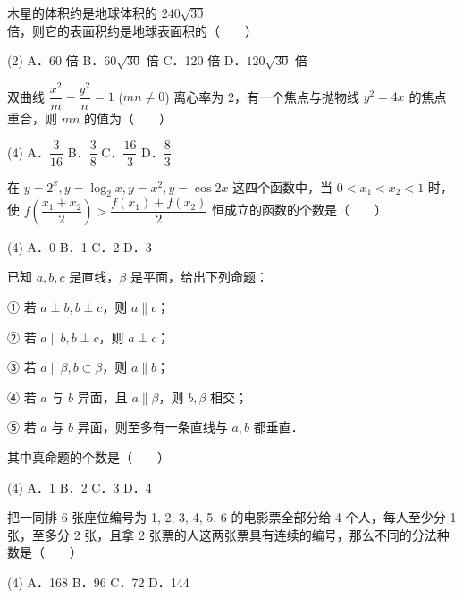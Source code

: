 \begin{question}
木星的体积约是地球体积的 $240\sqrt{30}$ 倍，则它的表面积约是地球表面积的\mbox{（　　）}

\begin{gkopts}(2)
\task A．60 倍
\task B．$60\sqrt{30}$ 倍
\task C．120 倍
\task D．$120\sqrt{30}$ 倍
\end{gkopts}

\end{question}
\begin{question}
双曲线 $\dfrac{x^2}{m} - \dfrac{y^2}{n} = 1$ ($mn \neq 0$) 离心率为 2，有一个焦点与抛物线 $y^2 = 4x$ 的焦点重合，则 $mn$ 的值为\mbox{（　　）}

\begin{gkopts}(4)
\task A．$\dfrac{3}{16}$
\task B．$\dfrac{3}{8}$
\task C．$\dfrac{16}{3}$
\task D．$\dfrac{8}{3}$
\end{gkopts}

\end{question}
\begin{question}
在 $y = 2^x, y = \log_2 x, y = x^2, y = \cos 2x$ 这四个函数中，当 $0 < x_1 < x_2 < 1$ 时，使 $f\left(\dfrac{x_1 + x_2}{2}\right) > \dfrac{f(x_1) + f(x_2)}{2}$ 恒成立的函数的个数是\mbox{（　　）}

\begin{gkopts}(4)
\task A．0
\task B．1
\task C．2
\task D．3
\end{gkopts}

\end{question}
\begin{question}
已知 $a, b, c$ 是直线，$\beta$ 是平面，给出下列命题：

① 若 $a \perp b, b \perp c$，则 $a \parallel c$；

② 若 $a \parallel b, b \perp c$，则 $a \perp c$；

③ 若 $a \parallel \beta, b \subset \beta$，则 $a \parallel b$；

④ 若 $a$ 与 $b$ 异面，且 $a \parallel \beta$，则 $b, \beta$ 相交；

⑤ 若 $a$ 与 $b$ 异面，则至多有一条直线与 $a, b$ 都垂直．

其中真命题的个数是\mbox{（　　）}

\begin{gkopts}(4)
\task A．1
\task B．2
\task C．3
\task D．4
\end{gkopts}

\end{question}
\begin{question}
把一同排 6 张座位编号为 1, 2, 3, 4, 5, 6 的电影票全部分给 4 个人，每人至少分 1 张，至多分 2 张，且拿 2 张票的人这两张票具有连续的编号，那么不同的分法种数是\mbox{（　　）}

\begin{gkopts}(4)
\task A．168
\task B．96
\task C．72
\task D．144
\end{gkopts}

\end{question}
